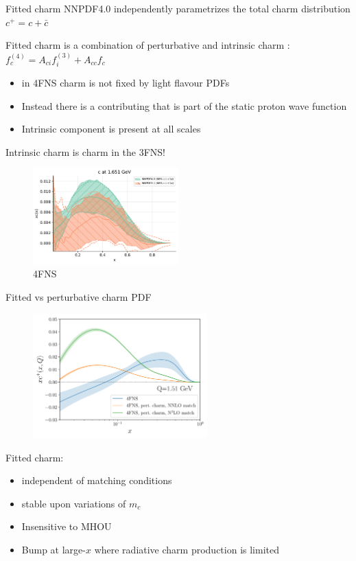 \documentclass[aspectratio=43, 8pt,t]{beamer}
\begin{document}
\begin{frame}{Fitted charm}
  NNPDF4.0 independently parametrizes the total charm distribution $c^+=c+\bar{c}$

  \vspace*{1em}
  Fitted charm is a combination of perturbative and intrinsic charm : \\
  $f_c^{(4)} = A_{ci}f_i^{(3)}+A_{cc}f_c^{}$
  \begin{itemize}
    \item in 4FNS charm is not fixed by light flavour PDFs
    \item Instead there is a contributing that is part of the static proton wave function
    \item Intrinsic component is present at all scales
  \end{itemize}

  \vspace*{1em}
  Intrinsic charm is charm in the 3FNS!

  \begin{figure}
    \includegraphics[width=0.5\textwidth]{nnpdf40_vs_nnpdf31.pdf}
    \caption*{4FNS}
  \end{figure}
\end{frame}

\begin{frame}{Fitted vs perturbative charm PDF}
  \begin{figure}
    \includegraphics[width=0.6\textwidth]{pch_vs_fitted_forward.pdf}
  \end{figure}

  Fitted charm:
  \begin{itemize}
    \item independent of matching conditions
    \item stable upon variations of $m_c$
    \item Insensitive to MHOU
    \item Bump at large-$x$ where radiative charm production is limited
  \end{itemize}
\end{frame}
\end{document}
